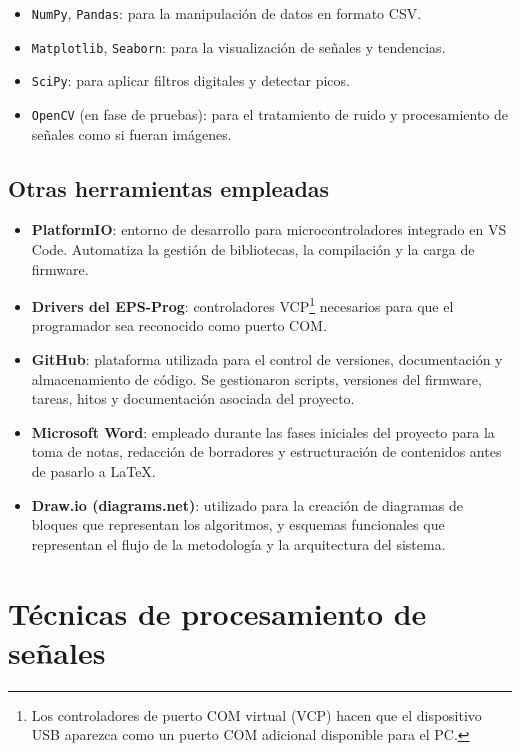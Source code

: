 \begin{itemize}
    \item \texttt{NumPy}, \texttt{Pandas}: para la manipulación de datos en formato CSV.
    \item \texttt{Matplotlib}, \texttt{Seaborn}: para la visualización de señales y tendencias.
    \item \texttt{SciPy}: para aplicar filtros digitales y detectar picos.
    \item \texttt{OpenCV} (en fase de pruebas): para el tratamiento de ruido y procesamiento de señales como si fueran imágenes.
\end{itemize}

\subsection{Otras herramientas empleadas}

\begin{itemize}
    \item \textbf{PlatformIO}: entorno de desarrollo para microcontroladores integrado en VS Code. Automatiza la gestión de bibliotecas, la compilación y la carga de firmware.
    \item \textbf{Drivers del EPS-Prog}: controladores VCP\footnote{Los controladores de puerto COM virtual (VCP) hacen que el dispositivo USB aparezca como un puerto COM adicional disponible para el PC.} necesarios para que el programador sea reconocido como puerto COM.
    \item \textbf{GitHub}: plataforma utilizada para el control de versiones, documentación y almacenamiento de código. Se gestionaron scripts, versiones del firmware, tareas, hitos y documentación asociada del proyecto.
    \item \textbf{Microsoft Word}: empleado durante las fases iniciales del proyecto para la toma de notas, redacción de borradores y estructuración de contenidos antes de pasarlo a LaTeX.
    \item \textbf{Draw.io (diagrams.net)}: utilizado para la creación de diagramas de bloques que representan los algoritmos, y esquemas funcionales que representan el flujo de la metodología y la arquitectura del sistema.

\end{itemize}


\section{Técnicas de procesamiento de señales}


